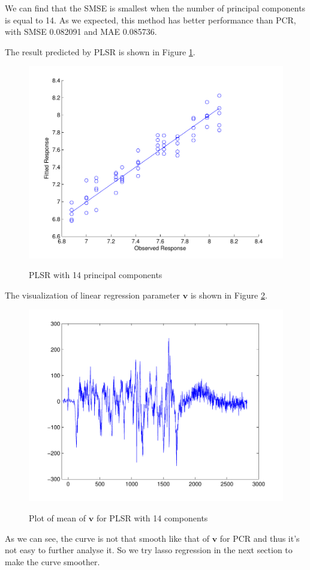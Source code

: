 \documentclass[a4paper]{article}
\newcommand{\bfv}{\mathbf{v}}
\begin{document}
\newpage
We can find that the SMSE is smallest when the number of principal components is equal to 14. As we expected, this method has better performance than PCR, with SMSE 0.082091 and MAE 0.085736. 

The result predicted by PLSR is shown in Figure \ref{pic6}.
\begin{figure}[h]
  \centering
  \includegraphics[width=.6\textwidth]{images/predict_PLSR.pdf}\\
  \caption{PLSR with 14 principal components}\label{pic6}
\end{figure}

The visualization of linear regression parameter $\bfv$ is shown in Figure \ref{pic7}.
\begin{figure}[h]
  \centering
  \includegraphics[width=.6\textwidth]{images/v_PLSR.pdf}\\
  \caption{Plot of mean of $\bfv$ for PLSR with 14 components}\label{pic7}
\end{figure}

As we can see, the curve is not that smooth like that of $\bfv$ for PCR and thus it's not easy to further analyse it. So we try lasso regression in the next section to make the curve smoother. 
\end{document}
